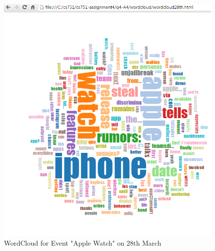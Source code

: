 \documentclass[12pt]{Report}
\begin{document}
\begin{figure}[ht]    
    \begin{center}
        \includegraphics[scale=0.60]{word28th.png}
        \caption{WordCloud for Event "Apple Watch" on 28th March }
        \label{WordCloud for Event "Apple Watch" on 28th March}
    \end{center}
\end{figure}
\end{document}
